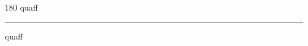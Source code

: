 
\begin{frame}
\begin{center}
\begin{turn}{180}
{\fontsize{2.5cm}{1em}\selectfont quaff}
\end{turn}
\vspace{1em}\par  
\hrule
\vspace{1em}\par  
{\fontsize{2.5cm}{1em}\selectfont quaff}
\end{center}
\end{frame}
